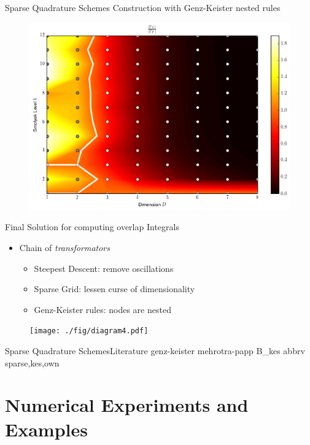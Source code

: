\documentclass{beamer}
\begin{document}
\begin{frame}{Sparse Quadrature Schemes}
  Construction with Genz-Keister nested rules
  \begin{figure}
    \centering
    \includegraphics[width=0.8\linewidth]{./fig/smolyak_genzkeister_ratiomap.png}
  \end{figure}
\end{frame}


\begin{frame}{Final Solution for computing overlap Integrals}
  \begin{itemize}
    \item Chain of \emph{transformators}
    \begin{itemize}
      \item Steepest Descent: remove oscillations
      \item Sparse Grid: lessen curse of dimensionality
      \item Genz-Keister rules: nodes are nested
    \end{itemize}
  \end{itemize}
  \begin{figure}
    \centering
    \texttt{[image: ./fig/diagram4.pdf]}
  \end{figure}
\end{frame}


\begin{frame}{Sparse Quadrature Schemes}{Literature}
  \nocite{sqs}{genz-keister}
  \nocite{sqs}{mehrotra-papp}
  \nocite{sqs}{B_kes}
  \scriptsize
  {abbrv}
  {sparse,kes,own}{}
\end{frame}


\section{Numerical Experiments and Examples}
\end{document}
